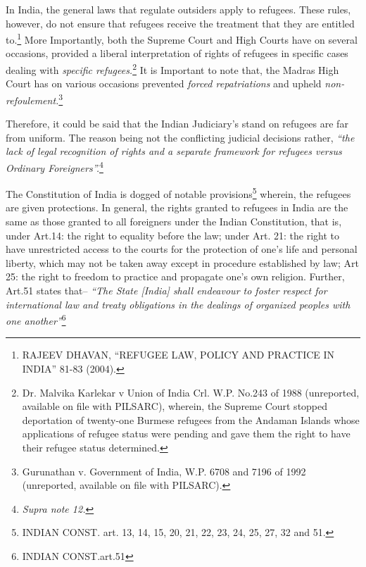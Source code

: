 \begin{multicols}{2}
\vspace{-.15cm}

\noi
In India, the general laws that regulate outsiders apply to refugees. These rules, however, do
not ensure that refugees receive the treatment that they are entitled to.\footnote{RAJEEV DHAVAN, “REFUGEE LAW, POLICY AND PRACTICE IN INDIA” 81-83 (2004).} More Importantly,
both the Supreme Court and High Courts have on several occasions, provided a liberal
interpretation of rights of refugees in specific cases dealing with \textit{specific refugees.}\footnote{Dr. Malvika Karlekar v Union of India Crl. W.P. No.243 of 1988 (unreported, available on file with PILSARC), wherein, the Supreme Court stopped deportation of twenty-one Burmese refugees from the Andaman Islands whose applications of refugee status were pending and gave them the right to
have their refugee status determined.} It is Important to note that, the Madras High Court has on various occasions prevented \textit{forced repatriations} and upheld \textit{non-refoulement.}\footnote{Gurunathan v. Government of India, W.P. 6708 and 7196 of 1992 (unreported, available on file with PILSARC).}

\vspace{-.15cm}

\noi
Therefore, it could be said that the Indian Judiciary’s stand on refugees are far from uniform.
The reason being not the conflicting judicial decisions rather, \textit{“the lack of legal recognition of
rights and a separate framework for refugees versus Ordinary Foreigners”.}\footnote{\textit{Supra note 12.}}

\vspace{-.2cm}


\vspace{-.2cm}

\noi
The Constitution of India is dogged of notable provisions\footnote{INDIAN CONST. art. 13, 14, 15, 20, 21, 22, 23, 24, 25, 27, 32 and 51.} wherein, the refugees are given protections. In general, the rights granted to refugees in India are the same as those granted to
all foreigners under the Indian Constitution, that is, under Art.14: the right to equality before
the law; under Art. 21: the right to have unrestricted access to the courts for the protection of
one's life and personal liberty, which may not be taken away except in procedure established
by law; Art 25: the right to freedom to practice and propagate one’s own religion. Further,
Art.51 states that– \textit{“The State [India] shall endeavour to foster respect for international law
and treaty obligations in the dealings of organized peoples with one another”}\footnote{INDIAN CONST.art.51}


\end{multicols}
